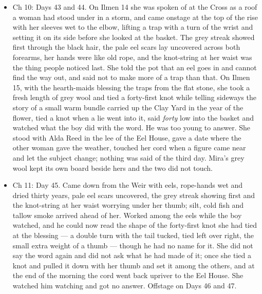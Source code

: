 \documentclass{design/chronicle}
\begin{document}
{\begin{itemize}[leftmargin=1.4em,itemsep=1pt,topsep=3pt,parsep=0pt]
\item Ch 10: Days 43 and 44. On Ilmen 14 she was spoken of at the Cross as a roof a woman had stood under in a storm, and came onstage at the top of the rise with her sleeves wet to the elbow, lifting a trap with a turn of the wrist and setting it on its side before she looked at the basket. The grey streak showed first through the black hair, the pale eel scars lay uncovered across both forearms, her hands were like old rope, and the knot-string at her waist was the thing people noticed last. She told the pot that an eel goes in and cannot find the way out, and said not to make more of a trap than that. On Ilmen 15, with the hearth-maids blessing the traps from the flat stone, she took a fresh length of grey wool and tied a forty-first knot while telling sideways the story of a small warm bundle carried up the Clay Yard in the year of the flower, tied a knot when a lie went into it, said \emph{forty} low into the basket and watched what the boy did with the word. He was too young to answer. She stood with Alda Reed in the lee of the Eel House, gave a date where the other woman gave the weather, touched her cord when a figure came near and let the subject change; nothing was said of the third day. Mira’s grey wool kept its own board beside hers and the two did not touch.

\end{itemize}

\begin{itemize}[leftmargin=1.4em,itemsep=1pt,topsep=3pt,parsep=0pt]

\item Ch 11: Day 45. Came down from the Weir with eels, rope-hands wet and dried thirty years, pale eel scars uncovered, the grey streak showing first and the knot-string at her waist worrying under her thumb; silt, cold fish and tallow smoke arrived ahead of her. Worked among the eels while the boy watched, and he could now read the shape of the forty-first knot she had tied at the blessing --- a double turn with the tail tucked, tied left over right, the small extra weight of a thumb --- though he had no name for it. She did not say the word again and did not ask what he had made of it; once she tied a knot and pulled it down with her thumb and set it among the others, and at the end of the morning the cord went back upriver to the Eel House. She watched him watching and got no answer. Offstage on Days 46 and 47.

\end{itemize}

}
\end{document}

